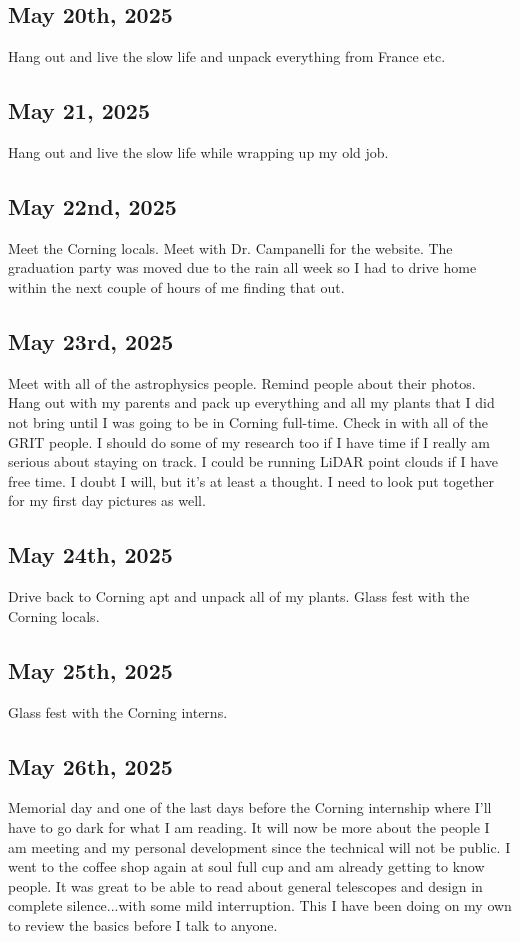 \documentclass{article}
\begin{document}
\subsection{May 20th, 2025}
Hang out and live the slow life and unpack everything from France etc. 

\subsection{May 21, 2025}
Hang out and live the slow life while wrapping up my old job. 

\subsection{May 22nd, 2025}
Meet the Corning locals. Meet with Dr. Campanelli for the website. The graduation party was moved due to the rain all week so I had to drive home within the next couple of hours of me finding that out. 

\subsection{May 23rd, 2025}
Meet with all of the astrophysics people. Remind people about their photos. Hang out with my parents and pack up everything and all my plants that I did not bring until I was going to be in Corning full-time. Check in with all of the GRIT people. I should do some of my research too if I have time if I really am serious about staying on track. I could be running LiDAR point clouds if I have free time. I doubt I will, but it's at least a thought. I need to look put together for my first day pictures as well. 


\subsection{May 24th, 2025}
Drive back to Corning apt and unpack all of my plants.
Glass fest with the Corning locals.

\subsection{May 25th, 2025}
Glass fest with the Corning interns.

\subsection{May 26th, 2025}
Memorial day and one of the last days before the Corning internship where I'll have to go dark for what I am reading. It will now be more about the people I am meeting and my personal development since the technical will not be public. I went to the coffee shop again at soul full cup and am already getting to know people. It was great to be able to read about general telescopes and design in complete silence...with some mild interruption. This I have been doing on my own to review the basics before I talk to anyone.  
\end{document}
